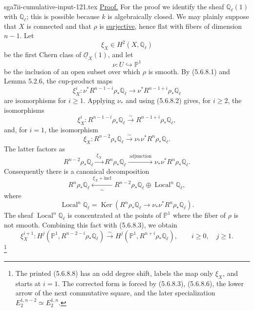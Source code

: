 \begin{filecontents*}{sga7ii-cumulative-input-121.tex}
\underline{Proof.}
For the proof we identify the sheaf $\mathbb Q_\ell(1)$ with
$\mathbb Q_\ell$; this is possible because $k$ is algebraically closed.
We may plainly suppose that $X$ is connected and that $\rho$ is
\underline{surjective}, hence flat with fibers of dimension $n-1$.  Let
\[
\xi_X\in H^2(X,\mathbb Q_\ell)
\]
be the first Chern class of $\underline{\mathcal O}_X(1)$, and let
\[
\nu:U\hookrightarrow\mathbb P^1
\]
be the inclusion of an open subset over which $\rho$ is smooth.  By
(5.6.8.1) and Lemma 5.2.6, the cup-product maps
\[
\xi_X^i:
\nu^*R^{n-1-i}\rho_*\mathbb Q_\ell
\longrightarrow
\nu^*R^{n-1+i}\rho_*\mathbb Q_\ell
\]
are isomorphisms for $i\geq1$.  Applying $\nu_*$ and using (5.6.8.2) gives,
for $i\geq2$, the isomorphisms
\begin{equation}\tag{5.6.8.3}
\xi_X^i:R^{n-1-i}\rho_*\mathbb Q_\ell
\overset{\sim}{\longrightarrow}
R^{n-1+i}\rho_*\mathbb Q_\ell,
\end{equation}
and, for $i=1$, the isomorphism
\begin{equation}\tag{5.6.8.4}
\xi_X:R^{n-2}\rho_*\mathbb Q_\ell
\overset{\sim}{\longrightarrow}
\nu_*\nu^*R^n\rho_*\mathbb Q_\ell.
\end{equation}
The latter factors as
\begin{equation}\tag{5.6.8.5}
R^{n-2}\rho_*\mathbb Q_\ell
\xrightarrow{\ \xi_X\ }
R^n\rho_*\mathbb Q_\ell
\xrightarrow{\ \text{adjunction}\ }
\nu_*\nu^*R^n\rho_*\mathbb Q_\ell.
\end{equation}
Consequently there is a canonical decomposition
\begin{equation}\tag{5.6.8.6}
R^n\rho_*\mathbb Q_\ell
\xleftarrow[\sim]{\ \xi_X+\mathrm{incl}\ }
R^{n-2}\rho_*\mathbb Q_\ell\oplus
\operatorname{Local}^n\mathbb Q_\ell,
\end{equation}
where
\begin{equation}\tag{5.6.8.7}
\operatorname{Local}^n\mathbb Q_\ell
=\operatorname{Ker}\!\left(
R^n\rho_*\mathbb Q_\ell
\longrightarrow\nu_*\nu^*R^n\rho_*\mathbb Q_\ell
\right).
\end{equation}
The sheaf $\operatorname{Local}^n\mathbb Q_\ell$ is concentrated at the
points of $\mathbb P^1$ where the fiber of $\rho$ is not smooth.  Combining
this fact with (5.6.8.3), we obtain
\begin{equation}\tag{5.6.8.8}
\xi_X^{i+1}:
H^j(\mathbb P^1,R^{n-2-i}\rho_*\mathbb Q_\ell)
\overset{\sim}{\longrightarrow}
H^j(\mathbb P^1,R^{n+i}\rho_*\mathbb Q_\ell),
\qquad i\geq0,\quad j\geq1.
\end{equation}
\footnote{The printed (5.6.8.8) has an odd degree shift, labels the map only
$\xi_X$, and starts at $i=1$.  The corrected form is forced by
(5.6.8.3), (5.6.8.6), the lower arrow of the next commutative square, and
the later specialization $E_2^{1,n-2}\simeq E_2^{1,n}$.}


\end{filecontents*}
